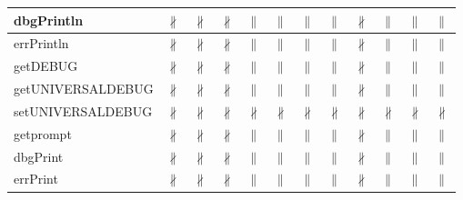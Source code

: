 \documentclass[10pt]{article}
\begin{document}
\begin{longtable}{|l|l|l|l|l|l|l|l|l|l|l|l|}
\hline
dbgPrintln&{\color{BrickRed}$\nparallel$}&{\color{BrickRed}$\nparallel$}&{\color{BrickRed}$\nparallel$}&{\color{blue}$\parallel$}&{\color{blue}$\parallel$}&{\color{blue}$\parallel$}&{\color{blue}$\parallel$}&{\color{BrickRed}$\nparallel$}&{\color{blue}$\parallel$}&{\color{blue}$\parallel$}&{\color{blue}$\parallel$}\\
\hline
errPrintln&{\color{BrickRed}$\nparallel$}&{\color{BrickRed}$\nparallel$}&{\color{BrickRed}$\nparallel$}&{\color{blue}$\parallel$}&{\color{blue}$\parallel$}&{\color{blue}$\parallel$}&{\color{blue}$\parallel$}&{\color{BrickRed}$\nparallel$}&{\color{blue}$\parallel$}&{\color{blue}$\parallel$}&{\color{blue}$\parallel$}\\
\hline
getDEBUG&{\color{BrickRed}$\nparallel$}&{\color{BrickRed}$\nparallel$}&{\color{BrickRed}$\nparallel$}&{\color{blue}$\parallel$}&{\color{blue}$\parallel$}&{\color{blue}$\parallel$}&{\color{blue}$\parallel$}&{\color{BrickRed}$\nparallel$}&{\color{blue}$\parallel$}&{\color{blue}$\parallel$}&{\color{blue}$\parallel$}\\
\hline
getUNIVERSALDEBUG&{\color{BrickRed}$\nparallel$}&{\color{BrickRed}$\nparallel$}&{\color{BrickRed}$\nparallel$}&{\color{blue}$\parallel$}&{\color{blue}$\parallel$}&{\color{blue}$\parallel$}&{\color{blue}$\parallel$}&{\color{BrickRed}$\nparallel$}&{\color{blue}$\parallel$}&{\color{blue}$\parallel$}&{\color{blue}$\parallel$}\\
\hline
setUNIVERSALDEBUG&{\color{BrickRed}$\nparallel$}&{\color{BrickRed}$\nparallel$}&{\color{BrickRed}$\nparallel$}&{\color{BrickRed}$\nparallel$}&{\color{BrickRed}$\nparallel$}&{\color{BrickRed}$\nparallel$}&{\color{BrickRed}$\nparallel$}&{\color{BrickRed}$\nparallel$}&{\color{BrickRed}$\nparallel$}&{\color{BrickRed}$\nparallel$}&{\color{BrickRed}$\nparallel$}\\
\hline
getprompt&{\color{BrickRed}$\nparallel$}&{\color{BrickRed}$\nparallel$}&{\color{BrickRed}$\nparallel$}&{\color{blue}$\parallel$}&{\color{blue}$\parallel$}&{\color{blue}$\parallel$}&{\color{blue}$\parallel$}&{\color{BrickRed}$\nparallel$}&{\color{blue}$\parallel$}&{\color{blue}$\parallel$}&{\color{blue}$\parallel$}\\
\hline
dbgPrint&{\color{BrickRed}$\nparallel$}&{\color{BrickRed}$\nparallel$}&{\color{BrickRed}$\nparallel$}&{\color{blue}$\parallel$}&{\color{blue}$\parallel$}&{\color{blue}$\parallel$}&{\color{blue}$\parallel$}&{\color{BrickRed}$\nparallel$}&{\color{blue}$\parallel$}&{\color{blue}$\parallel$}&{\color{blue}$\parallel$}\\
\hline
errPrint&{\color{BrickRed}$\nparallel$}&{\color{BrickRed}$\nparallel$}&{\color{BrickRed}$\nparallel$}&{\color{blue}$\parallel$}&{\color{blue}$\parallel$}&{\color{blue}$\parallel$}&{\color{blue}$\parallel$}&{\color{BrickRed}$\nparallel$}&{\color{blue}$\parallel$}&{\color{blue}$\parallel$}&{\color{blue}$\parallel$}\\
\hline
\end{longtable}
\newpage
\end{document}
